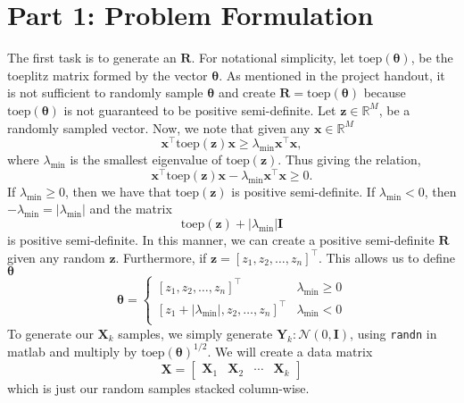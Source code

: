 \documentclass[a4paper]{article}
\begin{document}
\section*{Part 1: Problem Formulation}%
  The first task is to generate an $\mathbf{R}$. For notational simplicity, let $\text{toep}(\bm{\theta})$, be the toeplitz matrix formed by the vector $\bm{\theta}$. As mentioned in the project handout, it is not sufficient to randomly sample $\bm{\theta}$ and create $\mathbf{R} = \text{toep}(\bm{\theta})$ because $\text{toep}(\bm{\theta})$ is not guaranteed to be positive semi-definite.  Let $\bm{z} \in \mathds{R}^M$, be a randomly sampled vector. Now, we note that given any $\bm{x} \in \mathds{R}^M$
  \[
    \bm{x}^\top \text{toep}(\bm{z}) \bm{x} \geq \lambda_{\min} \bm{x}^\top \bm{x},
  \]
  where $\lambda_{\min}$ is the smallest eigenvalue of $\text{toep}(\bm{z})$. Thus giving the relation,
  \[
    \bm{x}^\top \text{toep}(\bm{z}) \bm{x} - \lambda_{\min} \bm{x}^\top \bm{x} \geq 0.
  \]
  If $\lambda_{\min} \geq 0$, then we have that $\text{toep}(\bm{z})$ is positive semi-definite. If $\lambda_{\min} < 0$, then $-\lambda_{\min} = |\lambda_{\min}|$ and the matrix
  \[
  \text{toep}(\bm{z}) + |\lambda_{\min}|\mathbf{I}
  \]
  is positive semi-definite. In this manner, we can create a positive semi-definite $\mathbf{R}$ given any random $\bm{z}$. Furthermore, if $\bm{z} = [z_1, z_2, \dots, z_n]^\top$. This allows us to define $\bm{\theta}$ 
  \[
    \bm{\theta} = 
    \begin{cases}
      [z_1, z_2, \dots, z_n]^\top & \lambda_{\min} \geq 0 \\
    [z_1 + |\lambda_{\min}|, z_2, \dots, z_n]^\top & \lambda_{\min} < 0 \\
    \end{cases}
  \]
  To generate our $\bm{X}_k$ samples, we simply generate $\mathbf{Y}_k: \mathcal{N}\left( 0, \mathbf{I} \right)$, using \texttt{randn} in matlab and multiply by $\text{toep}(\bm{\theta})^{1/2}$. We will create a data matrix
  \[
    \bm{X} = 
    \begin{bmatrix}
      \bm{X}_1 & \bm{X}_2 & \cdots & \bm{X}_k
    \end{bmatrix}
  \]
  which is just our random samples stacked column-wise.
\end{document}
